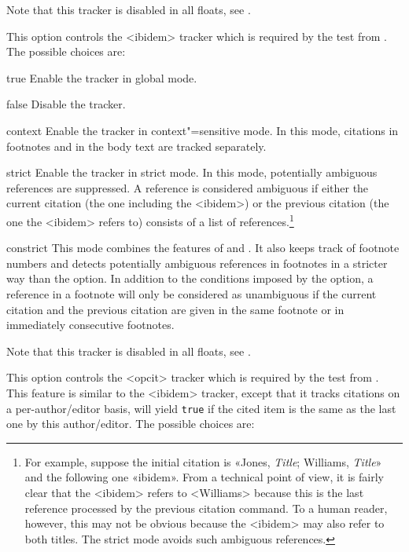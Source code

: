\documentclass{ltxdockit}[2011/03/25]
\begin{document}
\begin{optionlist}
Note that this tracker is disabled in all floats, see .


This option controls the <ibidem> tracker which is required by the  test from . The possible choices are:

\begin{valuelist}
\item[true] Enable the tracker in global mode.
\item[false] Disable the tracker.
\item[context] Enable the tracker in context"=sensitive mode. In this mode, citations in footnotes and in the body text are tracked separately.
\item[strict] Enable the tracker in strict mode. In this mode, potentially ambiguous references are suppressed. A reference is considered ambiguous if either the current citation (the one including the <ibidem>) or the previous citation (the one the <ibidem> refers to) consists of a list of references.\footnote{For example, suppose the initial citation is «Jones, \emph{Title}; Williams, \emph{Title}» and the following one «ibidem». From a technical point of view, it is fairly clear that the <ibidem> refers to <Williams> because this is the last reference processed by the previous citation command. To a human reader, however, this may not be obvious because the <ibidem> may also refer to both titles. The strict mode avoids such ambiguous references.}
\item[constrict] This mode combines the features of  and . It also keeps track of footnote numbers and detects potentially ambiguous references in footnotes in a stricter way than the  option. In addition to the conditions imposed by the  option, a reference in a footnote will only be considered as unambiguous if the current citation and the previous citation are given in the same footnote or in immediately consecutive footnotes.
\end{valuelist}

Note that this tracker is disabled in all floats, see .


This option controls the <opcit> tracker which is required by the  test from . This feature is similar to the <ibidem> tracker, except that it tracks citations on a per-author/editor basis, \ie {} will yield \texttt{true} if the cited item is the same as the last one by this author\slash editor. The possible choices are:


\end{optionlist}
\end{document}

